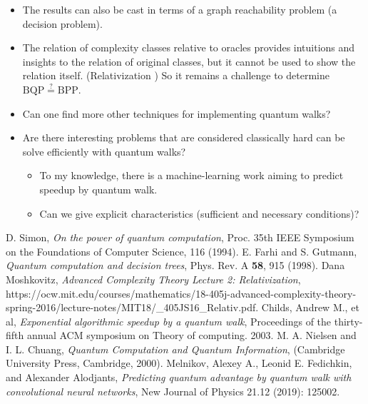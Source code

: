 \documentclass[aps,11pt,twoside,nofootinbib,tightenlines,superscriptaddress,preprintnumbers]{revtex4}
\newcommand{\<}{\langle}
\renewcommand{\>}{\rangle}
\newcommand{\BPP}{{\mathrm{BPP}}}
\newcommand{\BQP}{{\mathrm{BQP}}}
\newenvironment{proof sketch}
{\trivlist\item\noindent{\bf Proof sketch}~}
{\qed\endtrivlist}
\begin{document}
\begin{itemize}
    \item The results can also be cast in terms of a graph reachability problem (a decision problem).
    \item The relation of complexity classes relative to oracles provides intuitions and insights to the relation of original classes, but it cannot be used to show the relation itself. (Relativization \cite{MITACT16}) So it remains a challenge to determine $\BQP \overset{?}= \BPP$.
    \item Can one find more other techniques for implementing quantum walks?
    \item Are there interesting problems that are considered classically hard can be solve efficiently with quantum walks?
        \begin{itemize}
            \item To my knowledge, there is a machine-learning work aiming to predict speedup by quantum walk\cite{ALEX19}.
            \item Can we give explicit characteristics (sufficient and necessary conditions)?
        \end{itemize}
\end{itemize}




\begin{thebibliography}{9}
  D. Simon,
  {\em On the power of quantum computation},
  Proc. 35th IEEE Symposium on the Foundations of Computer Science,
  116 (1994).
  E. Farhi and S. Gutmann,
  {\em Quantum computation and decision trees},
  Phys. Rev. A {\bf 58}, 915 (1998).
  Dana Moshkovitz,
  {\em Advanced Complexity Theory Lecture 2: Relativization}, \\
  https://ocw.mit.edu/courses/mathematics/18-405j-advanced-complexity-theory-spring-2016/lecture-notes/MIT18/\_405JS16\_Relativ.pdf.
    Childs, Andrew M., et al,
    {\em Exponential algorithmic speedup by a quantum walk},
    Proceedings of the thirty-fifth annual ACM symposium on Theory of computing. 2003.
  M. A. Nielsen and I. L. Chuang,
  {\em Quantum Computation and Quantum Information},
  (Cambridge University Press, Cambridge, 2000).
 Melnikov, Alexey A., Leonid E. Fedichkin, and Alexander Alodjants,
 {\em Predicting quantum advantage by quantum walk with convolutional neural networks},
 New Journal of Physics 21.12 (2019): 125002.
  
\end{thebibliography}
\end{document}
